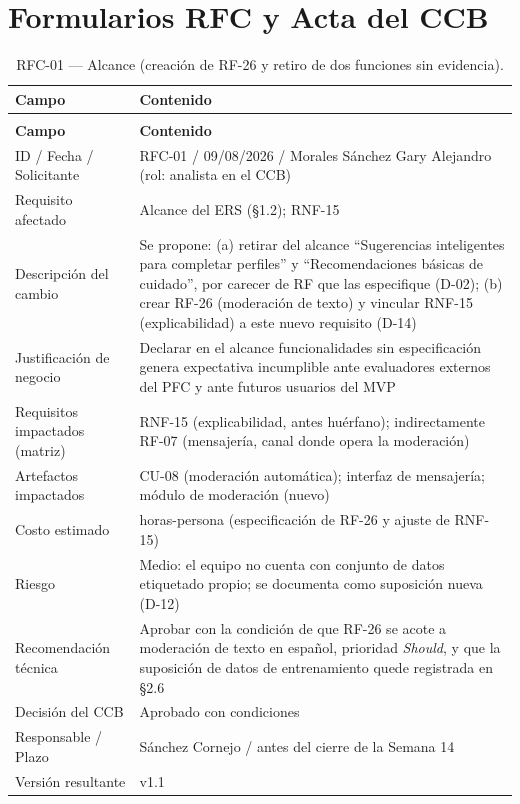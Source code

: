 \documentclass[journal,onecolumn]{IEEEtran}
\makeatletter
\newenvironment{atributos}[2]{%
	\small
	\begin{longtable}{@{}>{\raggedright\arraybackslash}p{4.2cm} >{\raggedright\arraybackslash}p{11.2cm}@{}}
		\caption{#2}\label{tab:#1}\\
		\toprule
		\textbf{Campo} & \textbf{Contenido} \\
		\midrule
		\endfirsthead
		\multicolumn{2}{@{}l}{\small\itshape (continuación)}\\
		\toprule
		\textbf{Campo} & \textbf{Contenido} \\
		\midrule
		\endhead
		\bottomrule
		\endlastfoot
	}{%
	\end{longtable}
	\normalsize
}
\makeatother
\begin{document}
	\section{Formularios RFC y Acta del CCB}
	\label{ap:anexoC}
	
	\begin{atributos}{rfc-01}{RFC-01 --- Alcance (creación de RF-26 y retiro de dos funciones sin evidencia).}
		ID / Fecha / Solicitante & RFC-01 / 09/08/2026 / Morales Sánchez Gary Alejandro (rol: analista en el CCB) \\
		Requisito afectado & Alcance del ERS (\S1.2); RNF-15 \\
		Descripción del cambio & Se propone: (a) retirar del alcance ``Sugerencias inteligentes para completar perfiles'' y ``Recomendaciones básicas de cuidado'', por carecer de RF que las especifique (D-02); (b) crear RF-26 (moderación de texto) y vincular RNF-15 (explicabilidad) a este nuevo requisito (D-14) \\
		Justificación de negocio & Declarar en el alcance funcionalidades sin especificación genera expectativa incumplible ante evaluadores externos del PFC y ante futuros usuarios del MVP \\
		Requisitos impactados (matriz) & RNF-15 (explicabilidad, antes huérfano); indirectamente RF-07 (mensajería, canal donde opera la moderación) \\
		Artefactos impactados & CU-08 (moderación automática); interfaz de mensajería; módulo de moderación (nuevo) \\
		Costo estimado & 6 horas-persona (especificación de RF-26 y ajuste de RNF-15) \\
		Riesgo & Medio: el equipo no cuenta con conjunto de datos etiquetado propio; se documenta como suposición nueva (D-12) \\
		Recomendación técnica & Aprobar con la condición de que RF-26 se acote a moderación de texto en español, prioridad \emph{Should}, y que la suposición de datos de entrenamiento quede registrada en \S2.6 \\
		Decisión del CCB & Aprobado con condiciones \\
		Responsable / Plazo & Sánchez Cornejo / antes del cierre de la Semana 14 \\
		Versión resultante & v1.1 \\
	\end{atributos}
	
\end{document}

